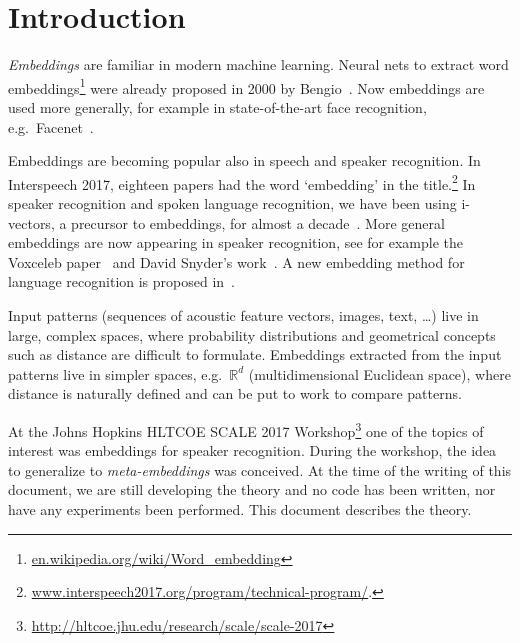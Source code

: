 \documentclass[a4paper,oneside,12pt,english]{report}
\def\R{\mathbb{R}}
\begin{document}
\maketitle



\hypersetup{pageanchor=true}


\tableofcontents
\listoffigures

\chapter{Introduction}

\emph{Embeddings} are familiar in modern machine learning. Neural nets to extract word embeddings\footnote{\url{en.wikipedia.org/wiki/Word_embedding}} were already proposed in 2000 by Bengio~\cite{Bengio_word_embedding}. Now embeddings are used more generally, for example in state-of-the-art face recognition, e.g.\ Facenet~\cite{Facenet}.

Embeddings are becoming popular also in speech and speaker recognition. In Interspeech 2017, eighteen papers had the word `embedding' in the title.\footnote{\url{www.interspeech2017.org/program/technical-program/}.} In speaker recognition and spoken language recognition, we have been using i-vectors, a precursor to embeddings, for almost a decade~\cite{ivector-Brighton,ivec,BUT_ivector_language}. More general embeddings are now appearing in speaker recognition, see for example the Voxceleb paper~\cite{Voxceleb} and David Snyder's work~\cite{end2end,DSIS17}. A new embedding method for language recognition is proposed in~\cite{LIMSI_Language_embedding}. 
 
Input patterns (sequences of acoustic feature vectors, images, text, \ldots) live in large, complex spaces, where probability distributions and geometrical concepts such as distance are difficult to formulate. Embeddings extracted from the input patterns live in simpler spaces, e.g.\ $\R^d$ (multidimensional Euclidean space), where distance is naturally defined and can be put to work to compare patterns. 

At the Johns Hopkins HLTCOE SCALE 2017 Workshop\footnote{\url{http://hltcoe.jhu.edu/research/scale/scale-2017}} one of the topics of interest was embeddings for speaker recognition. During the workshop, the idea to generalize to \emph{meta-embeddings} was conceived. At the time of the writing of this document, we are still developing the theory and no code has been written, nor have any experiments been performed. This document describes the theory.    
\end{document}
